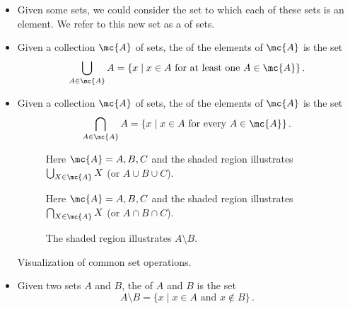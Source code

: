 \begin{itemize}
	\item Given some sets, we could consider the set to which 
	each of these sets is an element. We refer to this new set as 
	a  of sets.
	
	\item Given a collection $\mc{A}$ of sets, the 
	 of the elements of 
	$\mc{A}$ is the set
	\[
	\bigcup_{A \in \mc{A}} A = \{ x \mid x \in A \text{ for 
		at least one } A \in \mc{A} \}\,.
	\]

	\item Given a collection $\mc{A}$ of sets, the 
	 of the 
	elements of $\mc{A}$ is the set
	\[
	\bigcap_{A \in \mc{A}} A = \{ x \mid x \in A \text{ for 
		every } A \in \mc{A} \}\,.
	\]

\begin{marginfigure}
	\begin{subfigure}{2in}
		\centering
		\begin{venndiagram3sets}[
			tikzoptions={scale=.5,thick},
			shade=pink
		]
			\fillA	\fillB 	\fillC
		\end{venndiagram3sets}
		\caption{Here $\mc{A} = {A, B, C}$ and the shaded region 
			illustrates $\bigcup_{X \in \mc{A}} X$ (or $A \cup B 
			\cup C$).}
	\end{subfigure}
	\begin{subfigure}{2in}
		\centering
		\begin{venndiagram3sets}[
			tikzoptions={scale=.5,thick},
			shade=pink
		]
			\fillACapBCapC
		\end{venndiagram3sets}
		\caption{Here $\mc{A} = {A, B, C}$ and the shaded region 
			illustrates $\bigcap_{X \in \mc{A}} X$ (or $A \cap B 
			\cap C$).}
	\end{subfigure}
	\begin{subfigure}{2in}
		\centering
		\begin{venndiagram2sets}[
			tikzoptions={scale=.5,thick},
			shade=pink
		]
			\fillOnlyA
		\end{venndiagram2sets}
		\caption{The shaded region illustrates $A \setminus B$.}
	\end{subfigure}
	\caption{Visualization of common set operations.}
\end{marginfigure}
	
	\item Given two sets $A$ and $B$, the 
	 of $A$ and $B$ is 
	the set
	\[
		A \setminus B = \{ x \mid x \in A \text{ and } x \notin B 
		\}\,.
	\]
	

\end{itemize}
